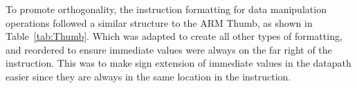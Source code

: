 To promote orthogonality, the instruction formatting for data manipulation operations followed a similar structure to the ARM Thumb, as shown in Table~\ref{tab:Thumb}. Which was adapted to create all other types of formatting, and reordered to ensure immediate values were always on the far right of the instruction. This was to make sign extension of immediate values in the datapath easier since they are always in the same location in the instruction. 

